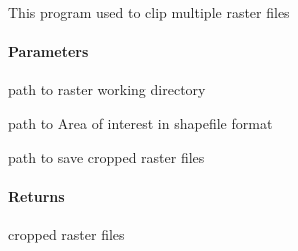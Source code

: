 \documentclass[letterpaper,10pt,english]{sphinxmanual}
\begin{document}
\begin{fulllineitems}
\label{\detokenize{akhdefo_functions:akhdefo_functions.Mosaic_Crop.Crop_to_AOI}}
\pysigstartsignatures
{}
\pysigstopsignatures
\sphinxAtStartPar
This program used to clip multiple  raster files


\paragraph{Parameters}
\label{\detokenize{akhdefo_functions:id28}}\begin{description}
\sphinxAtStartPar
path to raster working directory

\sphinxAtStartPar
path to Area of interest in shapefile format

\sphinxAtStartPar
path to save cropped raster files

\end{description}


\paragraph{Returns}
\label{\detokenize{akhdefo_functions:id29}}
\sphinxAtStartPar
cropped raster files

\end{fulllineitems}

\end{document}
